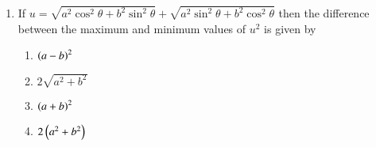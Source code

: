 \begin{enumerate}[label=\thesubsection.\arabic*,ref=\thesubsection.\theenumi]
\item If
$u=\sqrt{a^2 \cos^2 \theta+b^2 \sin^2 \theta}+\sqrt{a^2 \sin^2 \theta+b^2 \cos^2 \theta}$
then the difference between the  maximum and minimum values of $u^2$ is given by \hfill{}
\begin{multicols}{2} 
\begin{enumerate}
\item $\left(a-b\right)^2$
\item $2\sqrt{a^2 +b^2}$
\columnbreak
\item $\left(a+b\right)^2$
\item $2\left(a^2 +b^2\right)$
\end{enumerate} 
\end{multicols}
\end{enumerate}
